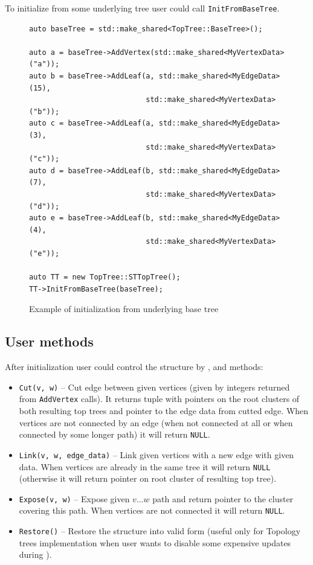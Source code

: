 To initialize from some underlying tree user could call \texttt{InitFromBaseTree}.

\begin{figure}[H]
\begin{verbatim}
auto baseTree = std::make_shared<TopTree::BaseTree>();

auto a = baseTree->AddVertex(std::make_shared<MyVertexData>("a"));
auto b = baseTree->AddLeaf(a, std::make_shared<MyEdgeData>(15),
                           std::make_shared<MyVertexData>("b"));
auto c = baseTree->AddLeaf(a, std::make_shared<MyEdgeData>(3),
                           std::make_shared<MyVertexData>("c"));
auto d = baseTree->AddLeaf(b, std::make_shared<MyEdgeData>(7),
                           std::make_shared<MyVertexData>("d"));
auto e = baseTree->AddLeaf(b, std::make_shared<MyEdgeData>(4),
                           std::make_shared<MyVertexData>("e"));

auto TT = new TopTree::STTopTree();
TT->InitFromBaseTree(baseTree);
\end{verbatim}
\caption{Example of initialization from underlying base tree}
\label{verb:example_init}
\end{figure}

\subsection{User methods}

After initialization user could control the structure by \Link, \Cut{} and \Expose{}
methods:
\begin{itemize}

\item \texttt{Cut(v, w)} -- Cut edge between given vertices (given by integers
returned from \texttt{AddVertex} calls). It returns tuple with pointers on the
root clusters of both resulting top trees and pointer to the edge data from
cutted edge. When vertices are not connected by an edge (when not connected at
all or when connected by some longer path) it will return \texttt{NULL}.

\item \texttt{Link(v, w, edge\_data)} -- Link given vertices with a new edge
with given data. When vertices are already in the same tree it will return
\texttt{NULL} (otherwise it will return pointer on root cluster of resulting top
tree).

\item \texttt{Expose(v, w)} -- Expose given $v\dots w$ path and return pointer to
the cluster covering this path. When vertices are not connected it will return
\texttt{NULL}.

\item \texttt{Restore()} -- Restore the structure into valid form (useful only
for Topology trees implementation when user wants to disable some expensive
updates during \Expose).

\end{itemize}

